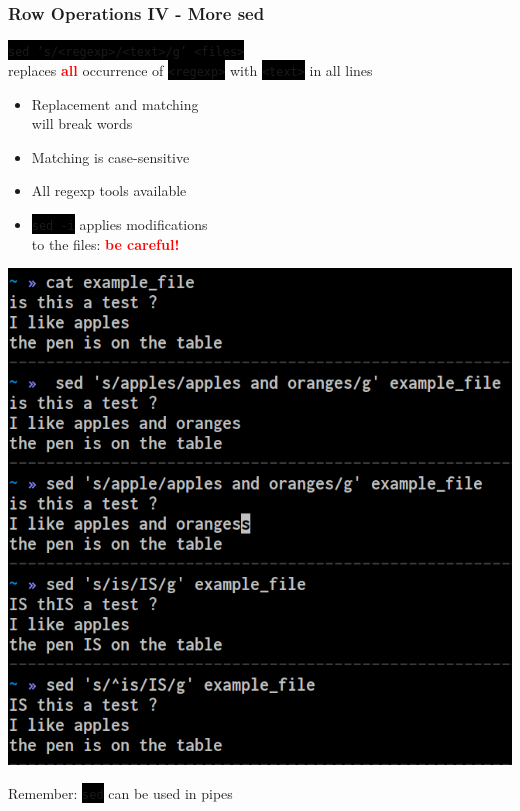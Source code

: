 \documentclass[unknownkeysallowed, 10pt, a4 paper, handout]{beamer}
\newcommand{\focus}[1]{\textbf{\textcolor{red}{#1}}}
\newcommand{\code}[1]{\colorbox{black}{\color{green}\texttt{#1}}}
\newcommand{\sidebyside}[5]{
  \begin{minipage}{#1\textwidth}
    #2
  \end{minipage} #3 \begin{minipage}{#4\textwidth}
    #5
  \end{minipage}
}
\begin{document}
\begin{frame}
  \begin{center}
    \frametitle{Row Operations IV - More sed}

     \code{sed 's/<regexp>/<text>/g' <files>}\\
     replaces \focus{all} occurrence of \code{<regexp>} with \code{<text>} in all lines

     \vspace{3mm}

     \sidebyside{0.54}{
       \begin{itemize}
         \item Replacement and matching\\
           will break words
         \item Matching is case-sensitive
         \item All regexp tools available
         \item \code{sed -i} applies modifications\\
           to the files: \focus{be careful!}
       \end{itemize}
     }{\hfill}{0.43}{
       \begin{center}
         \includegraphics[width=1.00\textwidth]{pics/sed-2.png}
       \end{center}
     }

     \vspace{3mm}

     Remember: \code{sed} can be used in pipes
  \end{center}
\end{frame}
\end{document}

